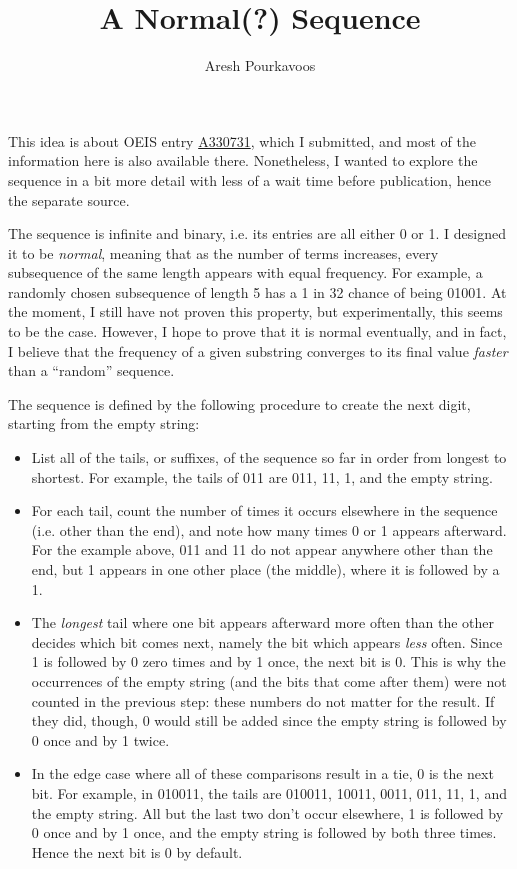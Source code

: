 \documentclass{article}
\begin{document}
\title{A Normal(?) Sequence}
\author{Aresh Pourkavoos}
\maketitle

This idea is about OEIS entry
\href{https://oeis.org/A330731}{A330731},
which I submitted,
and most of the information here
is also available there.
Nonetheless, I wanted to explore the sequence
in a bit more detail with less of a wait time before publication,
hence the separate source.

The sequence is infinite and binary,
i.e. its entries are all either 0 or 1.
I designed it to be \textit{normal},
meaning that as the number of terms increases,
every subsequence of the same length appears with equal frequency.
For example, a randomly chosen subsequence of length 5
has a 1 in 32 chance of being 01001.
At the moment, I still have not proven this property,
but experimentally, this seems to be the case.
However, I hope to prove that it is normal eventually,
and in fact, I believe that the frequency of a given substring
converges to its final value
\textit{faster} than a ``random'' sequence.

The sequence is defined by the following procedure
to create the next digit,
starting from the empty string:
\begin{itemize}
\item
  List all of the tails, or suffixes, of the sequence so far
  in order from longest to shortest.
  For example, the tails of 011 are 011, 11, 1, and the empty string.
\item
  For each tail, count the number of times it occurs elsewhere in the sequence
  (i.e. other than the end),
  and note how many times 0 or 1 appears afterward.
  For the example above,
  011 and 11 do not appear anywhere other than the end,
  but 1 appears in one other place (the middle),
  where it is followed by a 1.
\item
  The \textit{longest} tail where one bit appears afterward more often than the other
  decides which bit comes next,
  namely the bit which appears \textit{less} often.
  Since 1 is followed by 0 zero times and by 1 once,
  the next bit is 0.
  This is why the occurrences of the empty string (and the bits that come after them)
  were not counted in the previous step:
  these numbers do not matter for the result.
  If they did, though, 0 would still be added
  since the empty string is followed by 0 once and by 1 twice.
\item
  In the edge case where all of these comparisons result in a tie,
  0 is the next bit.
  For example, in 010011,
  the tails are 010011, 10011, 0011, 011, 11, 1, and the empty string.
  All but the last two don't occur elsewhere,
  1 is followed by 0 once and by 1 once,
  and the empty string is followed by both three times.
  Hence the next bit is 0 by default.
\end{itemize}
\end{document}
